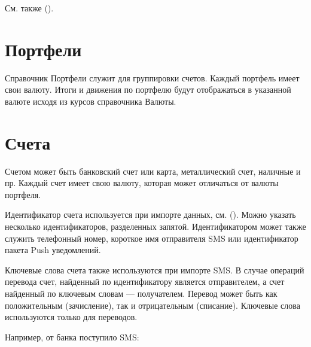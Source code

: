 \documentclass[a4paper,10pt,russian]{sphinxmanual}
\begin{document}
См. также {\hyperref[\detokenize{shared-transactions:chapter-shared-transactions}]{}} ().


\section{Портфели}
\label{\detokenize{directories:id3}}
Справочник Портфели служит для группировки счетов. Каждый портфель имеет свои валюту. Итоги и движения по портфелю
будут отображаться в указанной валюте исходя из курсов справочника Валюты.


\section{Счета}
\label{\detokenize{directories:id4}}
Счетом может быть банковский счет или карта, металлический счет,
наличные и пр. Каждый счет имеет свою валюту, которая может отличаться от валюты портфеля.

Идентификатор счета используется при импорте данных, см. {\hyperref[\detokenize{import:chapter-import}]{}} (). Можно указать несколько
идентификаторов, разделенных запятой. Идентификатором может также служить телефонный номер, короткое имя отправителя SMS
или идентификатор пакета Push уведомлений.

Ключевые слова счета также используются при импорте SMS. В случае операций перевода счет, найденный по идентификатору
является отправителем, а счет найденный по ключевым словам — получателем. Перевод может быть как положительным
(зачисление), так и отрицательным (списание). Ключевые слова используются только для переводов.

Например, от банка поступило SMS:

\begin{sphinxVerbatim}[commandchars=\\\{\}]
         
\end{sphinxVerbatim}
\end{document}

